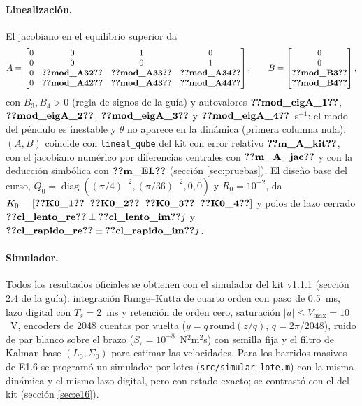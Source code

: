 \documentclass[11pt,a4paper]{article}
\begin{document}
\paragraph{Linealización.} El jacobiano en el equilibrio superior da
\begin{equation}
A=\begin{bmatrix}0&0&1&0\\0&0&0&1\\0&\V{mod_A32}&\V{mod_A33}&\V{mod_A34}\\0&\V{mod_A42}&\V{mod_A43}&\V{mod_A44}\end{bmatrix},\qquad
B=\begin{bmatrix}0\\0\\\V{mod_B3}\\\V{mod_B4}\end{bmatrix},
\end{equation}
con $B_3,B_4>0$ (regla de signos de la guía) y autovalores $\V{mod_eigA_1}$, $\V{mod_eigA_2}$, $\V{mod_eigA_3}$ y
$\V{mod_eigA_4}$~s$^{-1}$: el modo del péndulo es inestable y $\theta$ no aparece en la dinámica (primera columna
nula). $(A,B)$ coincide con \texttt{lineal\_qube} del kit con error relativo $\V{m_A_kit}$, con el jacobiano
numérico por diferencias centrales con $\V{m_A_jac}$ y con la deducción simbólica con $\V{m_EL}$ (sección
\ref{sec:pruebas}). El diseño base del curso, $Q_0=\operatorname{diag}((\pi/4)^{-2},(\pi/36)^{-2},0,0)$ y
$R_0=10^{-2}$, da $K_0=[\V{K0_1}\;\;\V{K0_2}\;\;\V{K0_3}\;\;\V{K0_4}]$ y polos de lazo cerrado
$\V{cl_lento_re}\pm \V{cl_lento_im}j$ y $\V{cl_rapido_re}\pm \V{cl_rapido_im}j$.

\paragraph{Simulador.} Todos los resultados oficiales se obtienen con el simulador del kit v1.1.1
(sección 2.4 de la guía): integración Runge--Kutta de cuarto orden con paso de 0.5~ms, lazo digital con
$T_s=2$~ms y retención de orden cero, saturación $|u|\le V_{\max}=10$~V, encoders de 2048 cuentas por vuelta
($y=q\,\mathrm{round}(z/q)$, $q=2\pi/2048$), ruido de par blanco sobre el brazo ($S_\tau=10^{-8}$~N$^2$m$^2$s) con semilla
fija y el filtro de Kalman base $(L_0,\Sigma_0)$ para estimar las velocidades. Para los barridos masivos de E1.6 se
programó un simulador por lotes (\texttt{src/simular\_lote.m}) con la misma dinámica y el mismo lazo digital, pero
con estado exacto; se contrastó con el del kit (sección \ref{sec:e16}).
\end{document}
